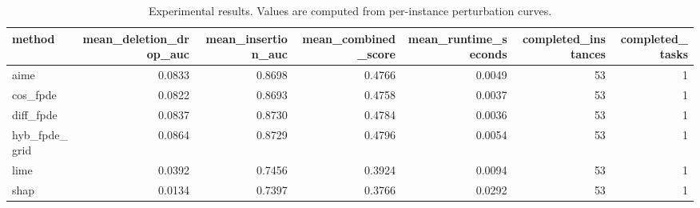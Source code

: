 \begin{table}[t]
\caption{Experimental results. Values are computed from per-instance perturbation curves.}
\label{tab:main_results_computed}
\centering
\begin{tabular}{lrrrrrr}
\toprule
method & mean\_deletion\_drop\_auc & mean\_insertion\_auc & mean\_combined\_score & mean\_runtime\_seconds & completed\_instances & completed\_tasks \\
\midrule
aime & 0.0833 & 0.8698 & 0.4766 & 0.0049 & 53 & 1 \\
cos\_fpde & 0.0822 & 0.8693 & 0.4758 & 0.0037 & 53 & 1 \\
diff\_fpde & 0.0837 & 0.8730 & 0.4784 & 0.0036 & 53 & 1 \\
hyb\_fpde\_grid & 0.0864 & 0.8729 & 0.4796 & 0.0054 & 53 & 1 \\
lime & 0.0392 & 0.7456 & 0.3924 & 0.0094 & 53 & 1 \\
shap & 0.0134 & 0.7397 & 0.3766 & 0.0292 & 53 & 1 \\
\bottomrule
\end{tabular}

\end{table}

